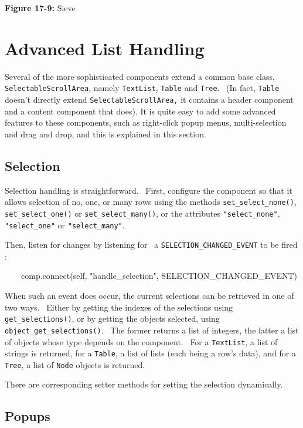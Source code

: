 {\sffamily\bfseries Figure 17-9:}
{\sffamily Sieve}

\section{Advanced List Handling}

Several of the more sophisticated components extend a common base class,
\texttt{SelectableScrollArea}, namely \texttt{TextList}, \texttt{Table}
and \texttt{Tree}. \ (In fact, \texttt{Table} doesn't
directly extend \texttt{SelectableScrollArea,} it contains a header
component and a content component that does). It is quite easy to add
some advanced features to these components, such as right-click popup
menus, multi-selection and drag and drop, and this is explained in this
section.

\subsection{Selection}

Selection handling is straightforward. \ First, configure the component
so that it allows selection of no, one, or many rows using the methods
\texttt{set\_select\_none()}, \texttt{set\_select\_one()} or
\texttt{set\_select\_many()}, or the attributes
\texttt{"select\_none"},
\texttt{"select\_one"} or
\texttt{"select\_many"}.

Then, listen for changes by listening for \ a
\texttt{SELECTION\_CHANGED\_EVENT} to be fired :

{\sffamily
\ \ \ \ comp.connect(self,
"handle\_selection",
SELECTION\_CHANGED\_EVENT)}

When such an event does occur, the current selections can be retrieved
in one of two ways. \ Either by getting the indexes of the selections
using \texttt{get\_selections()}, or by getting the objects selected,
using \texttt{object\_get\_selections()}. \ The former returns a list
of integers, the latter a list of objects whose type depends on the
component. \ For a \texttt{TextList}, a list of strings is returned,
for a \texttt{Table}, a list of lists (each being a
row's data), and for a \texttt{Tree}, a list of
\texttt{Node} objects is returned.

There are corresponding setter methods for setting the selection dynamically.


\subsection{Popups}

